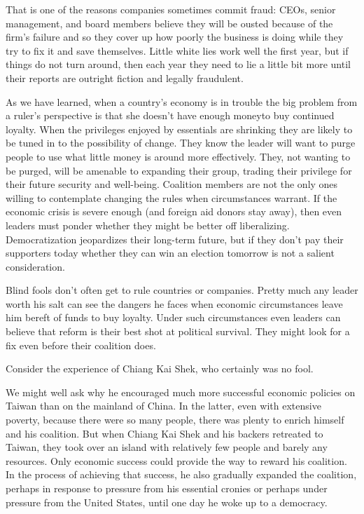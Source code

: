 \documentclass[10pt]{article}
\begin{document}
{\large That is one of the reasons companies sometimes commit fraud: CEOs,
senior management, and board members believe they will be ousted because of the
firm's failure and so they cover up how poorly the business is doing while they
try to fix it and save themselves. Little white lies work well the first year,
but if things do not turn around, then each year they need to lie a little bit
more until their reports are outright fiction and legally fraudulent.}

{\large As we have learned, when a country's economy is in trouble the big
problem from a ruler's perspective is that she doesn't have enough moneyto buy
continued loyalty. When the privileges enjoyed by essentials are shrinking they
are likely to be tuned in to the possibility of change. They know the leader will
want to purge people to use what little money is around more effectively. They,
not wanting to be purged, will be amenable to expanding their group, trading
their privilege for their future security and well-being. Coalition members are
not the only ones willing to contemplate changing the rules when circumstances
warrant. If the economic crisis is severe enough (and foreign aid donors stay
away), then even leaders must ponder whether they might be better off
liberalizing. Democratization jeopardizes their long-term future, but if they
don't pay their supporters today whether they can win an election tomorrow is not
a salient consideration.}

{\large Blind fools don't often get to rule countries or companies. Pretty much
any leader worth his salt can see the dangers he faces when economic
circumstances leave him bereft of funds to buy loyalty. Under such circumstances
even leaders can believe that reform is their best shot at political survival.
They might look for a fix even before their coalition does.}

{\large Consider the experience of Chiang Kai Shek, who certainly was no fool.}

{\large We might well ask why he encouraged much more successful economic
policies on Taiwan than on the mainland of China. In the latter, even with
extensive poverty, because there were so many people, there was plenty to enrich
himself and his coalition. But when Chiang Kai Shek and his backers retreated to
Taiwan, they took over an island with relatively few people and barely any
resources. Only economic success could provide the way to reward his coalition.
In the process of achieving that success, he also gradually expanded the
coalition, perhaps in response to pressure from his essential cronies or perhaps
under pressure from the United States, until one day he woke up to a democracy.}
\end{document}
